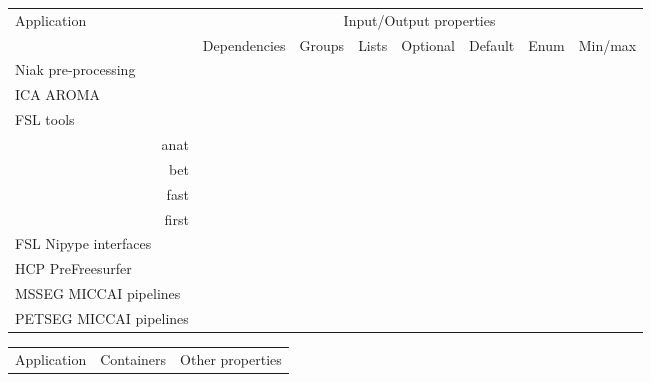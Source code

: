 \documentclass{article}
\begin{document}
\begin{table}
  \begin{tabular}{l|ccccccc}
    \rowcolor[gray]{0.9}
    Application               &\multicolumn{7}{c}{Input/Output properties} \\
    \rowcolor[gray]{0.9}
    & Dependencies      &Groups             & Lists             & Optional          &Default            & Enum              & Min/max\\
    
    \hline
    Niak pre-processing       &                   &\cellcolor{gray!75}&\cellcolor{gray!75}&\cellcolor{gray!75}&\cellcolor{gray!75}&\\
    ICA AROMA                 &\cellcolor{gray!75}&\cellcolor{gray!75}&                   &\cellcolor{gray!75}&\cellcolor{gray!75}&\cellcolor{gray!75}&\cellcolor{gray!75}\\
    FSL tools &&&&&&\\
    \multicolumn{1}{r|}{anat} &\cellcolor{gray!75}&\cellcolor{gray!75}&                   &\cellcolor{gray!75}&\cellcolor{gray!75}&\cellcolor{gray!75}&\cellcolor{gray!75}\\
    \multicolumn{1}{r|}{bet}  &\cellcolor{gray!75}&\cellcolor{gray!75}&\cellcolor{gray!75}&\cellcolor{gray!75}&                   &                   &\cellcolor{gray!75}\\      
    \multicolumn{1}{r|}{fast} &\cellcolor{gray!75}&                   &                   &\cellcolor{gray!75}&\cellcolor{gray!75}&\cellcolor{gray!75}&\cellcolor{gray!75}\\
    \multicolumn{1}{r|}{first}&                   &                   &\cellcolor{gray!75}&\cellcolor{gray!75}&\cellcolor{gray!75}&                   &                   \\
    FSL Nipype interfaces     \\
    HCP PreFreesurfer         &                   &                   &                   &                   &                   &                   &                   \\
    MSSEG MICCAI pipelines    \\
    PETSEG MICCAI pipelines   \\
    \end{tabular}
  \vspace*{0.5cm}
  \begin{tabular}{l|ccc|ccc}
    \hline
    \rowcolor[gray]{0.9}
    Application               &\multicolumn{3}{c|}{Containers} &  \multicolumn{3}{c}{Other properties}  \\

\end{tabular}
\end{table}
\end{document}
